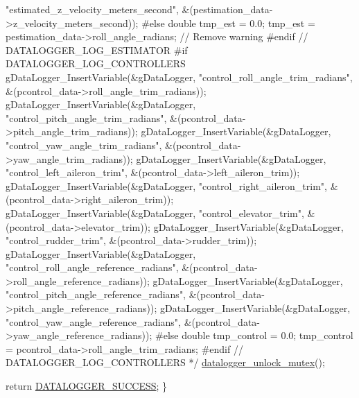 \begin{DoxyCode}
{       "estimated\_z\_velocity\_meters\_second", &(pestimation\_data->z\_velocity\_meters\_second));}
\textcolor{comment}{        #else}
\textcolor{comment}{    double tmp\_est = 0.0;}
\textcolor{comment}{        tmp\_est = pestimation\_data->roll\_angle\_radians; // Remove warning}
\textcolor{comment}{    #endif // DATALOGGER\_LOG\_ESTIMATOR}
\textcolor{comment}{}
\textcolor{comment}{    #if DATALOGGER\_LOG\_CONTROLLERS}
\textcolor{comment}{        gDataLogger\_InsertVariable(&gDataLogger,
       "control\_roll\_angle\_trim\_radians", &(pcontrol\_data->roll\_angle\_trim\_radians));}
\textcolor{comment}{        gDataLogger\_InsertVariable(&gDataLogger,
       "control\_pitch\_angle\_trim\_radians", &(pcontrol\_data->pitch\_angle\_trim\_radians));}
\textcolor{comment}{        gDataLogger\_InsertVariable(&gDataLogger,
       "control\_yaw\_angle\_trim\_radians", &(pcontrol\_data->yaw\_angle\_trim\_radians));}
\textcolor{comment}{        gDataLogger\_InsertVariable(&gDataLogger, "control\_left\_aileron\_trim",
       &(pcontrol\_data->left\_aileron\_trim));}
\textcolor{comment}{        gDataLogger\_InsertVariable(&gDataLogger, "control\_right\_aileron\_trim",
       &(pcontrol\_data->right\_aileron\_trim));}
\textcolor{comment}{        gDataLogger\_InsertVariable(&gDataLogger, "control\_elevator\_trim",
       &(pcontrol\_data->elevator\_trim));}
\textcolor{comment}{        gDataLogger\_InsertVariable(&gDataLogger, "control\_rudder\_trim",
       &(pcontrol\_data->rudder\_trim));}
\textcolor{comment}{        gDataLogger\_InsertVariable(&gDataLogger,
       "control\_roll\_angle\_reference\_radians", &(pcontrol\_data->roll\_angle\_reference\_radians));}
\textcolor{comment}{        gDataLogger\_InsertVariable(&gDataLogger,
       "control\_pitch\_angle\_reference\_radians", &(pcontrol\_data->pitch\_angle\_reference\_radians));}
\textcolor{comment}{        gDataLogger\_InsertVariable(&gDataLogger,
       "control\_yaw\_angle\_reference\_radians", &(pcontrol\_data->yaw\_angle\_reference\_radians));}
\textcolor{comment}{    #else}
\textcolor{comment}{    double tmp\_control = 0.0;}
\textcolor{comment}{    tmp\_control = pcontrol\_data->roll\_angle\_trim\_radians;}
\textcolor{comment}{    #endif // DATALOGGER\_LOG\_CONTROLLERS}
\textcolor{comment}{*/}
    \hyperlink{datalogger_01_07Caio-PC's_01conflicted_01copy_012012-11-23_08_8c_a85453211c0c809083c36cc56b275aeeb}{datalogger\_unlock\_mutex}();

    \textcolor{keywordflow}{return} \hyperlink{datalogger_01_07Caio-PC's_01conflicted_01copy_012012-11-23_08_8h_abddebaf71d26d40183fccbb1a766b983}{DATALOGGER\_SUCCESS};
\}
\end{DoxyCode}
